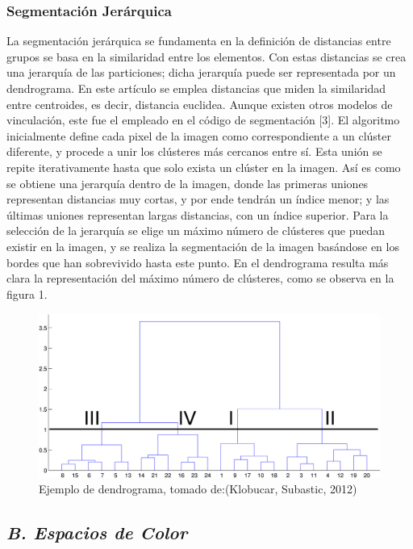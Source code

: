 \documentclass[10pt,twocolumn,letterpaper]{article}
\begin{document}
\subsubsection*{ Segmentación Jerárquica}
La segmentación jerárquica se fundamenta en la definición de distancias entre grupos se basa en la similaridad entre los elementos. Con estas distancias se crea una jerarquía de las particiones; dicha jerarquía puede ser representada por un dendrograma. En este artículo se emplea distancias que miden la similaridad entre centroides, es decir, distancia euclidea. Aunque existen otros modelos de vinculación, este fue el empleado  en el código de segmentación [3].
El algoritmo inicialmente define cada pixel de la imagen como correspondiente a un clúster diferente, y procede a unir los clústeres más cercanos entre sí. Esta unión se repite iterativamente hasta que solo exista un clúster en la imagen. Así es como se obtiene una jerarquía dentro de la imagen, donde las primeras uniones representan distancias muy cortas, y por ende tendrán un índice menor; y las últimas uniones representan largas distancias, con un índice superior. Para la selección de la jerarquía se elige un máximo número de clústeres que puedan existir en la imagen, y se realiza la segmentación de la imagen basándose en los bordes que han sobrevivido hasta este punto. En el dendrograma  resulta más clara la representación del máximo número de clústeres, como se observa en la figura 1.
 \begin{figure}[H]
\begin{center}
   \includegraphics[scale = 0.1]{klobucar}
\end{center}
   \caption{Ejemplo de dendrograma, tomado de:(Klobucar, Subastic, 2012) }
\end{figure}

\subsection{\textit{B. Espacios de Color}}
\end{document}
